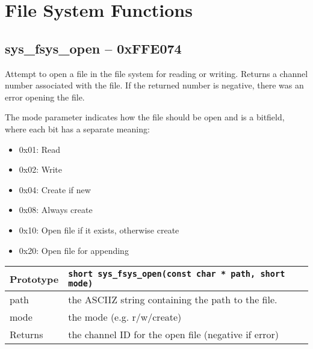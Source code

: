 \section{File System Functions}



\subsection*{sys\_fsys\_open -- 0xFFE074}
Attempt to open a file in the file system for reading or writing.
Returns a channel number associated with the file.
If the returned number is negative, there was an error opening the file.

The mode parameter indicates how the file should be open and is a bitfield, where each bit has a separate meaning:
\begin{itemize}
    \item 0x01: Read
    \item 0x02: Write
    \item 0x04: Create if new
    \item 0x08: Always create
    \item 0x10: Open file if it exists, otherwise create
    \item 0x20: Open file for appending
\end{itemize}

\bigskip		

\begin{tabular}{|l||l|} \hline
Prototype & \lstinline!short sys_fsys_open(const char * path, short mode)! \\ \hline
path & the ASCIIZ string containing the path to the file. \\ \hline
mode & the mode (e.g. r/w/create) \\ \hline
Returns & the channel ID for the open file (negative if error) \\ \hline
\end{tabular}

